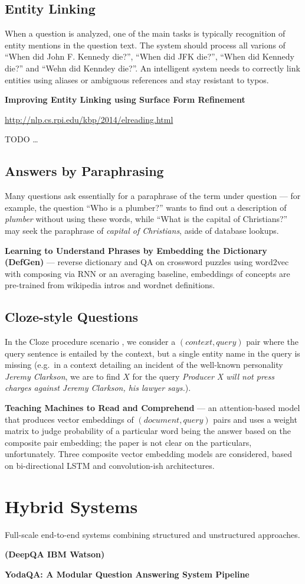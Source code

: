 \documentclass[11pt,a4paper]{article}
\begin{document}
\subsection{Entity Linking}

When a question is analyzed, one of the main tasks is typically recognition
of entity mentions in the question text.  The system should process all
varions of ``When did John F. Kennedy die?'', ``When did JFK die?'',
``When did Kennedy die?'' and ``Wehn did Kenndey die?''.  An intelligent
system needs to correctly link entities using aliases or ambiguous
references and stay resistant to typos.

\textbf{Improving Entity Linking using Surface Form Refinement}

\url{http://nlp.cs.rpi.edu/kbp/2014/elreading.html}

TODO \dots

\subsection{Answers by Paraphrasing}

Many questions ask essentially for a paraphrase of the term under
question --- for example, the question ``Who is a plumber?'' wants
to find out a description of \textit{plumber} without using these
words, while ``What is the capital of Christians?'' may seek the
paraphrase of \textit{capital of Christians}, aside of database lookups.

\textbf{Learning to Understand Phrases by Embedding the Dictionary (DefGen)} \cite{DefGen}
	--- reverse dictionary and QA on crossword puzzles using word2vec
	with composing via RNN or an averaging baseline, embeddings of
	concepts are pre-trained from wikipedia intros and wordnet definitions.

\subsection{Cloze-style Questions}

In the Cloze procedure scenario \cite{Cloze},
we consider a $(context, query)$ pair where the query
sentence is entailed by the context, but a single entity name in the query
is missing (e.g.\ in a context detailing an incident of the well-known personality
\textit{Jeremy Clarkson}, we are to find $X$ for the query
\textit{Producer X will not press charges against Jeremy Clarkson, his lawyer says.}).

\textbf{Teaching Machines to Read and Comprehend} \cite{ReadAndComprehend}
	--- an attention-based model that produces vector embeddings of $(document, query)$
	pairs and uses a weight matrix to judge probability of a particular
	word being the answer based on the composite pair embedding;
	the paper is not clear on the particulars, unfortunately.
	Three composite vector embedding models are considered,
	based on bi-directional LSTM and convolution-ish architectures.

\section{Hybrid Systems}

Full-scale end-to-end systems combining structured and unstructured approaches.

\textbf{(DeepQA IBM Watson)} \cite{WatsonOverview}

\textbf{YodaQA: A Modular Question Answering System Pipeline} \cite{YodaQAPoster2015}



\end{document}
